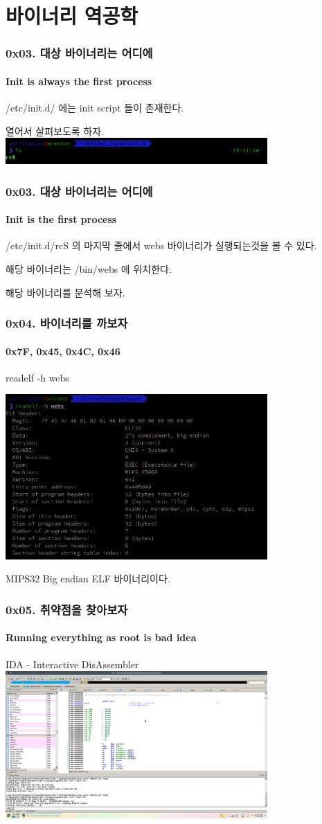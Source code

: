 \documentclass {beamer}
\begin{document}
\section[Section]{바이너리 역공학}
\begin{frame}
  \frametitle{0x03. 대상 바이너리는 어디에}
  \framesubtitle{Init is always the first process}

  /etc/init.d/ 에는 init script 들이 존재한다.

  열어서 살펴보도록 하자.
  \includegraphics [width=100mm]{img/WeVO_K501_initscript.png}
\end{frame}

\begin{frame}
  \frametitle{0x03. 대상 바이너리는 어디에}
  \framesubtitle{Init is the first process}

  /etc/init.d/rcS 의 마지막 줄에서 webs 바이너리가 실행되는것을 볼 수 있다.

  해당 바이너리는 /bin/webs 에 위치한다.

  해당 바이너리를 분석해 보자.
\end{frame}

\begin{frame}
  \frametitle{0x04. 바이너리를 까보자}
  \framesubtitle{0x7F, 0x45, 0x4C, 0x46}

  readelf -h webs

  \includegraphics [width=100mm]{img/webs_readelf.png}

  MIPS32 Big endian ELF 바이너리이다.
\end{frame}

\begin{frame}
  \frametitle{0x05. 취약점을 찾아보자}
  \framesubtitle{Running everything as root is bad idea}

  IDA - Interactive DisAssembler
  \includegraphics [width=100mm]{img/webs_idamain.png}
\end{frame}
\end{document}
